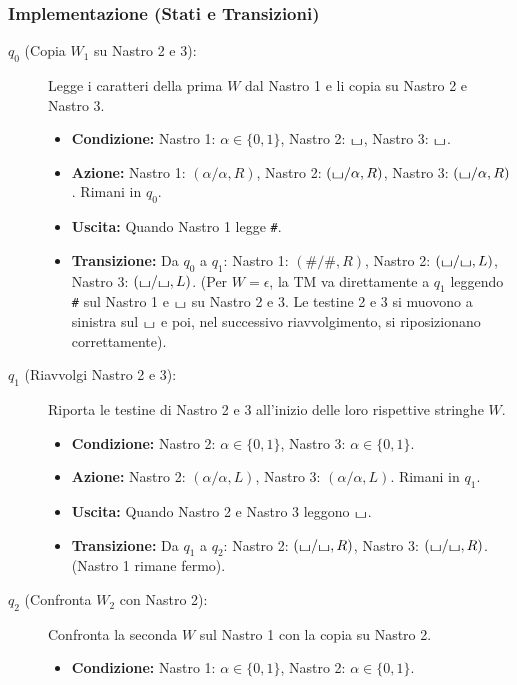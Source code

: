 \documentclass[a4paper]{article}
\theoremstyle{definition} %
\newcommand{\blankS}{\ensuremath{\raisebox{-0.15ex}{\scalebox{1.3}[0.7]{$\sqcup$}}}}
\begin{document}
\subsubsection{Implementazione (Stati e Transizioni)}
\begin{description}
    \item[$q_0$ (Copia $W_1$ su Nastro 2 e 3):] Legge i caratteri della prima $W$ dal Nastro 1 e li copia su Nastro 2 e Nastro 3.
    \begin{itemize}
        \item \textbf{Condizione:} Nastro 1: $\alpha \in \{0,1\}$, Nastro 2: $\blankS$, Nastro 3: $\blankS$.
        \item \textbf{Azione:} Nastro 1: $(\alpha/\alpha, R)$, Nastro 2: $(\blankS/\alpha, R)$, Nastro 3: $(\blankS/\alpha, R)$. Rimani in $q_0$.
        \item \textbf{Uscita:} Quando Nastro 1 legge \texttt{\#}.
        \item \textbf{Transizione:} Da $q_0$ a $q_1$: Nastro 1: $(\#/\#, R)$, Nastro 2: $(\blankS/\blankS, L)$, Nastro 3: $(\blankS/\blankS, L)$. (Per $W=\epsilon$, la TM va direttamente a $q_1$ leggendo \texttt{\#} sul Nastro 1 e $\blankS$ su Nastro 2 e 3. Le testine 2 e 3 si muovono a sinistra sul $\blankS$ e poi, nel successivo riavvolgimento, si riposizionano correttamente).
    \end{itemize}
    \item[$q_1$ (Riavvolgi Nastro 2 e 3):] Riporta le testine di Nastro 2 e 3 all'inizio delle loro rispettive stringhe $W$.
    \begin{itemize}
        \item \textbf{Condizione:} Nastro 2: $\alpha \in \{0,1\}$, Nastro 3: $\alpha \in \{0,1\}$.
        \item \textbf{Azione:} Nastro 2: $(\alpha/\alpha, L)$, Nastro 3: $(\alpha/\alpha, L)$. Rimani in $q_1$.
        \item \textbf{Uscita:} Quando Nastro 2 e Nastro 3 leggono $\blankS$.
        \item \textbf{Transizione:} Da $q_1$ a $q_2$: Nastro 2: $(\blankS/\blankS, R)$, Nastro 3: $(\blankS/\blankS, R)$. (Nastro 1 rimane fermo).
    \end{itemize}
    \item[$q_2$ (Confronta $W_2$ con Nastro 2):] Confronta la seconda $W$ sul Nastro 1 con la copia su Nastro 2.
    \begin{itemize}
        \item \textbf{Condizione:} Nastro 1: $\alpha \in \{0,1\}$, Nastro 2: $\alpha \in \{0,1\}$.

\end{itemize}
\end{description}
\end{document}
